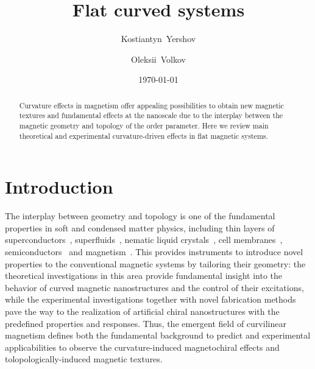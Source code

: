 \documentclass[showpacs,amsmath,amssymb,aps,pra,longbibliography,
10pt,preprint,superscriptaddress,showkeys]{revtex4-1}
\begin{document}
	\title{Flat curved systems}

	\date{\today}
	
	\author{Kostiantyn~Yershov}
	
	\author{Oleksii~Volkov}
	
	
\begin{abstract}
	Curvature effects in magnetism offer appealing possibilities to obtain new magnetic textures and fundamental effects at the nanoscale due to the interplay between the magnetic geometry and topology of the order parameter. Here we review main theoretical and experimental curvature-driven effects in flat magnetic systems.  
\end{abstract}
	
\maketitle
\tableofcontents
\clearpage	
\section{Introduction}\label{sec:intro}

The interplay between geometry and topology is one of the fundamental properties in soft and condensed matter physics, including thin layers of superconductors~\cite{Tempere09,Ying17}, superfluids~\cite{Kuratsuji12}, nematic liquid crystals~\cite{Lopez-Leon11}, cell membranes~\cite{McMahon05}, semiconductors~\cite{Gentile15,Ortix15} and magnetism~\cite{Streubel16}. This provides instruments to introduce novel properties to the conventional magnetic systems by tailoring their geometry: the theoretical investigations in this area provide fundamental insight into the behavior of curved magnetic nanostructures and the control of their excitations, while the experimental investigations together with novel fabrication methods pave the way to the realization of artificial chiral nanostructures with the predefined properties and responses. Thus, the emergent field of curvilinear magnetism defines both the fundamental background to predict and experimental applicabilities to observe the curvature-induced magnetochiral effects and tolopologically-induced magnetic textures. 
\end{document}
